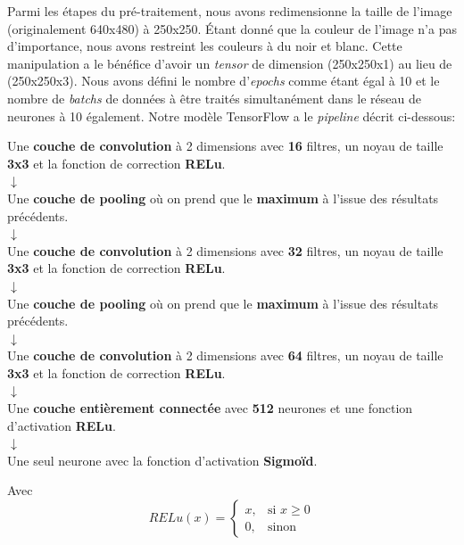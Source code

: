 \documentclass[french]{article}
\theoremstyle{mytheoremstyle}
\theoremstyle{mytheoremstyle}
\theoremstyle{myproblemstyle}
\begin{document}
       Parmi les étapes du pré-traitement, nous avons redimensionne la taille de l'image (originalement 640x480) à 250x250. Étant donné que la couleur de l'image n'a pas d'importance, nous avons restreint les couleurs à du noir et blanc. Cette manipulation a le bénéfice d'avoir un \emph{tensor} de dimension (250x250x1) au lieu de (250x250x3). Nous avons défini le nombre d'\emph{epochs} comme étant égal à 10 et le nombre de \emph{batchs} de données à être traités simultanément dans le réseau de neurones à 10 également. Notre modèle TensorFlow a le \emph{pipeline} décrit ci-dessous:
        \begin{center}
            Une \textbf{couche de convolution} à 2 dimensions avec \textbf{16} filtres, un noyau de taille \textbf{3x3} et la fonction de correction \textbf{RELu}. \\
            $
            \downarrow
            $\\
            Une \textbf{couche de pooling} où on prend que le \textbf{maximum} à l'issue des résultats précédents. \\
            $
            \downarrow
            $\\
            Une \textbf{couche de convolution} à 2 dimensions avec \textbf{32} filtres, un noyau de taille \textbf{3x3} et la fonction de correction \textbf{RELu}. \\
            $
            \downarrow
            $\\
            Une \textbf{couche de pooling} où on prend que le \textbf{maximum} à l'issue des résultats précédents. \\
            $
            \downarrow
            $\\
            Une \textbf{couche de convolution} à 2 dimensions avec \textbf{64} filtres, un noyau de taille \textbf{3x3} et la fonction de correction \textbf{RELu}.\\
            $
            \downarrow
            $\\
            Une \textbf{couche entièrement connectée} avec \textbf{512} neurones et une fonction d'activation \textbf{RELu}.\\
            $
            \downarrow
            $\\
            Une seul neurone avec la fonction d'activation \textbf{Sigmoïd}.
        \end{center}
        Avec 
        \[
        RELu(x) = \begin{cases}
            x,& \text{si } x \ge 0\\
            0,& \text{sinon}
        \end{cases}
        \]
\end{document}
